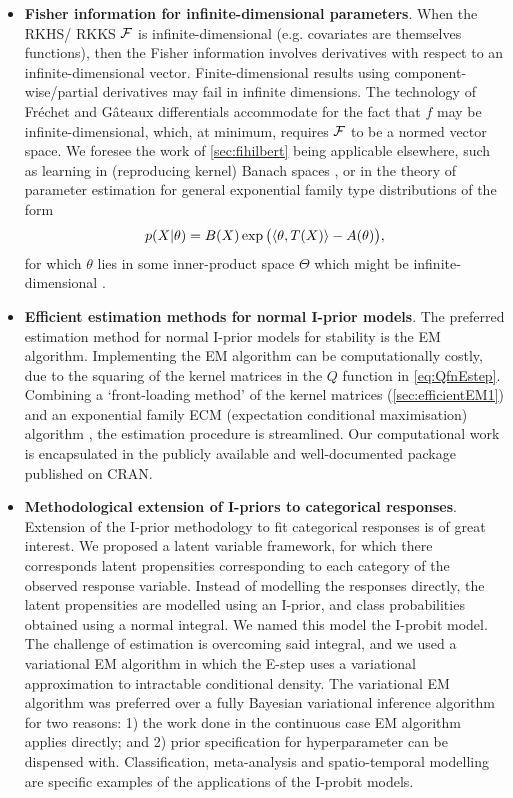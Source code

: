 \documentclass[a4paper,showframe,11pt]{report}
\begin{document}
\begin{itemize}
  \item \textbf{Fisher information for infinite-dimensional parameters}. 
  When the RKHS/ RKKS ${\mathcal F}$ is infinite-dimensional (e.g. covariates are themselves functions), then the Fisher information involves derivatives with respect to an infinite-dimensional vector.
  Finite-dimensional results using component-wise/partial derivatives may fail in infinite dimensions.
  The technology of Fréchet and Gâteaux differentials accommodate for the fact that $f$ may be infinite-dimensional, which, at minimum, requires ${\mathcal F}$ to be a  normed vector space. 
  We foresee the work of \cref{sec:fihilbert} being applicable elsewhere, such as learning in (reproducing kernel) Banach spaces \citep{zhang2009reproducing,zhang2012regularized}, or in the theory of parameter estimation for general exponential family type distributions of the form
  \[
    p(X|\theta) = B(X)\exp\big(\langle\theta,T(X)\rangle - A(\theta) \big),
  \]
  for which $\theta$ lies in some inner-product space $\Theta$ which might be infinite-dimensional \citep{sriperumbudur2013density}.
  
  \item \textbf{Efficient estimation methods for normal I-prior models}. 
  The preferred estimation method for normal I-prior models for stability is the EM algorithm.
  Implementing the EM algorithm can be computationally costly, due to the squaring of the kernel matrices in the $Q$ function in \cref{eq:QfnEstep}.
  Combining a `front-loading method' of the kernel matrices (\cref{sec:efficientEM1}) and an exponential family ECM (expectation conditional maximisation) algorithm \citep{meng1993maximum}, the estimation procedure is streamlined.
  Our computational work is encapsulated in the publicly available and well-documented  package  published on CRAN.
  
  \item \textbf{Methodological extension of I-priors to categorical responses}.
  Extension of the I-prior methodology to fit categorical responses is of great interest.
  We proposed a latent variable framework, for which there corresponds latent propensities corresponding to each category of the observed response variable.
  Instead of modelling the responses directly, the latent propensities are modelled using an I-prior, and class probabilities obtained using a normal integral.
  We named this model the I-probit model.
  The challenge of estimation is overcoming said integral, and we used a variational EM algorithm in which the E-step uses a variational approximation to intractable conditional density.
  The variational EM algorithm was preferred over a fully Bayesian variational inference algorithm for two reasons: 1) the work done in the continuous case EM algorithm applies directly; and 2) prior specification for hyperparameter can be dispensed with.
  Classification, meta-analysis and spatio-temporal modelling are specific examples of the applications of the I-probit models.
  

\end{itemize}
\end{document}
